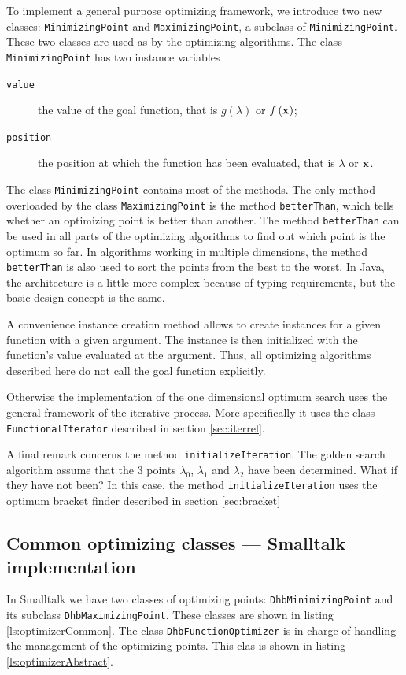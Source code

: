 \documentclass[twoside]{book}
\begin{document}
To implement a general purpose optimizing framework, we introduce
two new classes: {\tt MinimizingPoint} and {\tt MaximizingPoint},
 a subclass of {\tt MinimizingPoint}. These two classes
are used as  by the optimizing algorithms. The
class {\tt MinimizingPoint} has two instance variables
\begin{description}
  \item[\tt value] the value of the goal function, that is
  $g\left(\lambda\right)$ or $f\left({\bf x}\right)$;
  \item[\tt position] the position at which the function has been
  evaluated, that is $\lambda$ or ${\bf x}$.
\end{description}
The class {\tt MinimizingPoint} contains most of the methods. The
only method overloaded by the class  {\tt MaximizingPoint} is the
method {\tt betterThan}, which tells whether an optimizing point
is better than another. The method {\tt betterThan} can be used in
all parts of the optimizing algorithms to find out which point is
the optimum so far. In algorithms working in multiple dimensions,
the method {\tt betterThan} is also used to sort the points from
the best to the worst. In Java, the architecture is a little more
complex because of typing requirements, but the basic design
concept is the same.

A convenience instance creation method allows to create instances
for a given function with a given argument. The instance is then
initialized with the function's value evaluated at the argument.
Thus, all optimizing algorithms described here do not call the
goal function explicitly.

Otherwise the implementation of the one dimensional optimum search
uses the general framework of the iterative process. More
specifically it uses the class {\tt FunctionalIterator} described
in section \ref{sec:iterrel}.

A final remark concerns the method {\tt initializeIteration}. The
golden search algorithm assume that the 3 points $\lambda_0$,
$\lambda_1$ and $\lambda_2$ have been determined. What if they
have not been? In this case, the method {\tt initializeIteration}
uses the optimum bracket finder described in section
\ref{sec:bracket}

\subsection{Common optimizing classes --- Smalltalk implementation}
\label{sec:sgeneralOpt}  In Smalltalk we have two classes
of optimizing points: {\tt DhbMinimizingPoint} and its subclass
{\tt DhbMaximizingPoint}. These classes are shown in listing
\ref{ls:optimizerCommon}. The class {\tt DhbFunctionOptimizer} is
in charge of handling the management of the optimizing points.
This clas is shown in listing \ref{ls:optimizerAbstract}.
\end{document}
